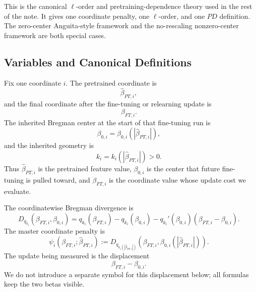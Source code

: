 \documentclass[11pt]{article}
\begin{document}
This is the canonical \(\ell\)-order and pretraining-dependence theory used in the rest of the note. It gives one coordinate penalty, one \(\ell\)-order, and one \(PD\) definition. The zero-center Anguita-style framework and the no-rescaling nonzero-center framework are both special cases.

\subsection{Variables and Canonical Definitions}

Fix one coordinate \(i\). The pretrained coordinate is
\begin{equation}
    \widehat\beta_{PT,i},
\end{equation}
and the final coordinate after the fine-tuning or relearning update is
\begin{equation}
    \beta_{FT,i}.
\end{equation}
The inherited Bregman center at the start of that fine-tuning run is
\begin{equation}
    \beta_{0,i}=\beta_{0,i}(|\widehat\beta_{PT,i}|),
\end{equation}
and the inherited geometry is
\begin{equation}
    k_i=k_i(|\widehat\beta_{PT,i}|)>0.
\end{equation}
Thus \(\widehat\beta_{PT,i}\) is the pretrained feature value, \(\beta_{0,i}\) is the center that future fine-tuning is pulled toward, and \(\beta_{FT,i}\) is the coordinate value whose update cost we evaluate.

The coordinatewise Bregman divergence is
\begin{equation}
    D_{q_{k_i}}(\beta_{FT,i},\beta_{0,i})
    =
    q_{k_i}(\beta_{FT,i})
    -
    q_{k_i}(\beta_{0,i})
    -
    q_{k_i}'(\beta_{0,i})(\beta_{FT,i}-\beta_{0,i}).
\end{equation}
The master coordinate penalty is
\begin{equation}
    \boxed{
    \psi_i(\beta_{FT,i};\widehat\beta_{PT,i})
    :=
    D_{q_{k_i(|\widehat\beta_{PT,i}|)}}(\beta_{FT,i},\beta_{0,i}(|\widehat\beta_{PT,i}|))
    }.
\end{equation}
The update being measured is the displacement
\begin{equation}
    \beta_{FT,i}-\beta_{0,i}.
\end{equation}
We do not introduce a separate symbol for this displacement below; all formulas keep the two betas visible.
\end{document}

